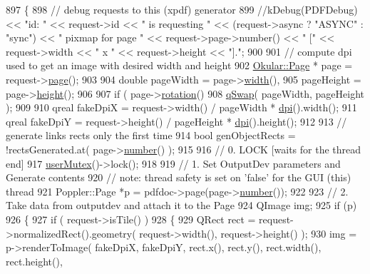 \begin{DoxyCode}
897 \{
898     \textcolor{comment}{// debug requests to this (xpdf) generator}
899     \textcolor{comment}{//kDebug(PDFDebug) << "id: " << request->id << " is requesting " << (request->async ? "ASYNC" : "sync")
       <<  " pixmap for page " << request->page->number() << " [" << request->width << " x " << request->height <<
       "].";}
900 
901     \textcolor{comment}{// compute dpi used to get an image with desired width and height}
902     \hyperlink{classOkular_1_1Page}{Okular::Page} * page = request->\hyperlink{classOkular_1_1PixmapRequest_a83b5e81f2e908e70f3c19a0a3c07fab3}{page}();
903 
904     \textcolor{keywordtype}{double} pageWidth = page->\hyperlink{classOkular_1_1Page_a57114e88281da2a51b1bb0d5d4996d53}{width}(),
905            pageHeight = page->\hyperlink{classOkular_1_1Page_a67246a32b3e625946eb5c685b8372a4f}{height}();
906 
907     \textcolor{keywordflow}{if} ( page->\hyperlink{classOkular_1_1Page_a731947e32744bdcda791d22a2dc88726}{rotation}() %
908         \hyperlink{htmlextension_8h_a6aa0d61b42274f15f4a693b0c7bea484}{qSwap}( pageWidth, pageHeight );
909 
910     qreal fakeDpiX = request->width() / pageWidth * \hyperlink{classOkular_1_1Generator_ad3dd14822e3f5c9d1785008a207f34fb}{dpi}().width();
911     qreal fakeDpiY = request->height() / pageHeight * \hyperlink{classOkular_1_1Generator_ad3dd14822e3f5c9d1785008a207f34fb}{dpi}().height();
912 
913     \textcolor{comment}{// generate links rects only the first time}
914     \textcolor{keywordtype}{bool} genObjectRects = !rectsGenerated.at( page->\hyperlink{classOkular_1_1Page_a6eee5f157a130b47d81ddd63e501664b}{number}() );
915 
916     \textcolor{comment}{// 0. LOCK [waits for the thread end]}
917     \hyperlink{classOkular_1_1Generator_a83d702cccbce2288c3258d97f1f15e19}{userMutex}()->lock();
918 
919     \textcolor{comment}{// 1. Set OutputDev parameters and Generate contents}
920     \textcolor{comment}{// note: thread safety is set on 'false' for the GUI (this) thread}
921     Poppler::Page *p = pdfdoc->page(page->\hyperlink{classOkular_1_1Page_a6eee5f157a130b47d81ddd63e501664b}{number}());
922 
923     \textcolor{comment}{// 2. Take data from outputdev and attach it to the Page}
924     QImage img;
925     \textcolor{keywordflow}{if} (p)
926     \{
927         \textcolor{keywordflow}{if} ( request->isTile() )
928         \{
929             QRect rect = request->normalizedRect().geometry( request->width(), request->height() );
930             img = p->renderToImage( fakeDpiX, fakeDpiY, rect.x(), rect.y(), rect.width(), rect.height(), 

\end{DoxyCode}
